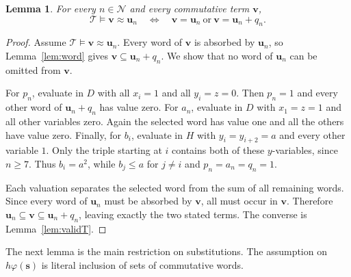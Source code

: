 \documentclass[10pt,a4paper]{amsart}
\newtheorem{lemma}[theorem]{Lemma}
\newcommand{\T}{\mathcal T}
\newcommand{\Ncal}{\mathcal N}
\newcommand{\bu}{\mathbf u}
\newcommand{\bv}{\mathbf v}
\newcommand{\bs}{\mathbf s}
\numberwithin{equation}{section}
\begin{document}
\begin{lemma}\label{lem:class}
For every $n\in\Ncal$ and every commutative term $\bv$,
\[
\T\models\bv\approx\bu_n
\quad\Longleftrightarrow\quad
\bv=\bu_n\ \text{or}\ \bv=\bu_n+q_n.
\]
\end{lemma}
\begin{proof}
Assume $\T\models\bv\approx\bu_n$. Every word of $\bv$ is absorbed
by $\bu_n$, so Lemma~\ref{lem:word} gives
$\bv\subseteq\bu_n+q_n$. We show that no word of $\bu_n$ can be
omitted from $\bv$.

For $p_n$, evaluate in $D$ with all $x_i=1$ and all $y_i=z=0$.
Then $p_n=1$ and every other word of $\bu_n+q_n$ has value zero.
For $a_n$, evaluate in $D$ with $x_1=z=1$ and all other variables zero.
Again the selected word has value one and all the others have value zero.
Finally, for $b_i$, evaluate in $H$ with $y_i=y_{i+2}=a$ and every other
variable $1$. Only the triple starting at $i$ contains both of these
$y$-variables, since $n\geq7$. Thus $b_i=a^2$, while $b_j\leq a$
for $j\ne i$ and $p_n=a_n=q_n=1$.

Each valuation separates the selected word from the sum of all remaining
words. Since every word of $\bu_n$ must be absorbed by $\bv$, all must
occur in $\bv$. Therefore
$\bu_n\subseteq\bv\subseteq\bu_n+q_n$, leaving exactly the two stated
terms. The converse is Lemma~\ref{lem:validT}.
\end{proof}

The next lemma is the main restriction on substitutions. The assumption
on $h\varphi(\bs)$ is literal inclusion of sets of commutative words.
\end{document}
